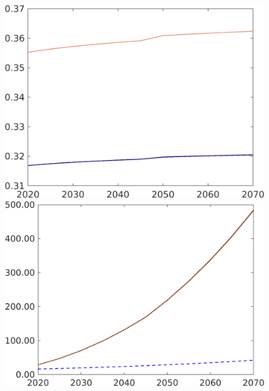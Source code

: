 \begin{figure}[h!!]
\begin{minipage}[]{0.32\textwidth}
\end{minipage}
\begin{minipage}[]{0.32\textwidth}
	\includegraphics[width=1\textwidth]{../../codding_model/own_basedOnFried/optimalPol_190722_tidiedUp/figures/all_10Aout22/CountMod1_target_hl_regime3_spillover0_sep1_extern0_PV1_etaa0.79_lgd0.png}
\end{minipage}
\begin{minipage}[]{0.32\textwidth}
	\includegraphics[width=1\textwidth]{../../codding_model/own_basedOnFried/optimalPol_190722_tidiedUp/figures/all_10Aout22/CountMod1_target_Ag_regime3_spillover0_sep1_extern0_PV1_etaa0.79_lgd0.png}

\end{minipage}
\end{figure}
